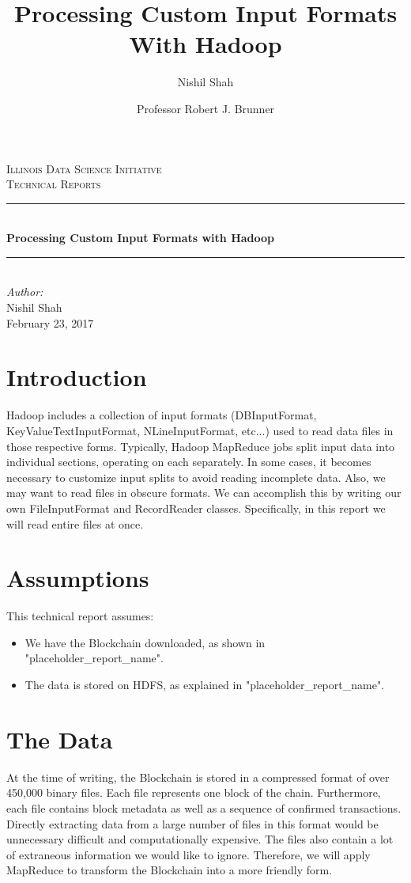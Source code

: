 \documentclass[9pt,twocolumn,twoside]{idsi}
\author[1,3]{Nishil Shah}
\author[2,3]{Professor Robert J. Brunner}
\affil[1]{National Center For Supercomputing Applications (NCSA)}
\affil[2]{Laboratory for Computation, Data, and Machine Learning}
\affil[3]{Illinois Data Science Initiative}
\title{Processing Custom Input Formats With Hadoop}
\newcommand{\HRule}{\rule{\linewidth}{0.5mm}}
\begin{document}
\begin{titlepage}
\center
\textsc{\LARGE Illinois Data Science Initiative}\\[1.5cm]
\textsc{\Large Technical Reports}\\[0.5cm] \HRule \\[0.4cm]
{\huge \bfseries Processing Custom Input Formats with Hadoop } \\[0.4cm] \HRule \\[1.5cm]
\Large \emph{Author:}\\ Nishil Shah \\[3cm]
{\large February 23, 2017}\\[3cm] %
\vfill
\end{titlepage}
%

\maketitle

\section{Introduction}
Hadoop includes a collection of input formats (DBInputFormat, KeyValueTextInputFormat, NLineInputFormat, etc...) used to read data files in those respective forms. Typically, Hadoop MapReduce jobs split input data into individual sections, operating on each separately. In some cases, it becomes necessary to customize input splits to avoid reading incomplete data. Also, we may want to read files in obscure formats. We can accomplish this by writing our own FileInputFormat and RecordReader classes. Specifically, in this report we will read entire files at once.

\section{Assumptions}
This technical report assumes:
\begin{itemize}
    \item We have the Blockchain downloaded, as shown in "placeholder\_report\_name".
    \item The data is stored on HDFS, as explained in "placeholder\_report\_name".
\end{itemize}

\section{The Data}
At the time of writing, the Blockchain is stored in a compressed format of over 450,000 binary files. Each file represents one block of the chain. Furthermore, each file contains block metadata as well as a sequence of confirmed transactions. Directly extracting data from a large number of files in this format would be unnecessary difficult and computationally expensive. The files also contain a lot of extraneous information we would like to ignore. Therefore, we will apply MapReduce to transform the Blockchain into a more friendly form.
\end{document}
